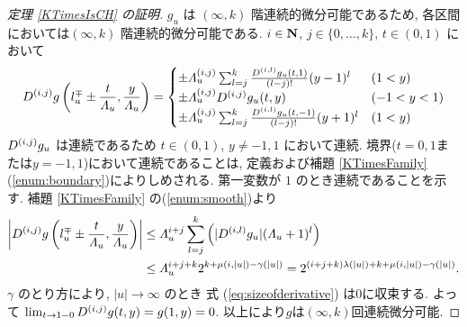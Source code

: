 \begin{proof}[\rm 定理 \ref{KTimesIsCH} の証明]
 $g_u$ は $(\infty, k)$ 階連続的微分可能であるため,
 各区間においては$(\infty, k)$ 階連続的微分可能である.
 $i \in \mathbf N$, $j \in \{0, \dots, k\}$, $t \in (0, 1)$ において
\begin{equation}
   D^{(i, j)}g \left(l^\mp_u \pm \frac{t}{\varLambda_u}, \frac{y}{\varLambda_u}\right)
   = \begin{cases}
      \pm \varLambda_u^{(i, j)} \sum^{k}_{l=j} \frac{D^{(i,l)} g_u(t,1)}{(l-j)!}
      (y - 1)^l &  (1<y)
      \\
      \pm \varLambda_u^{(i,j)} D^{(i, j)} g_u(t, y) & (-1 < y < 1)
      \\
      \pm \varLambda_u^{(i, j)} \sum^{k}_{l=j} 
      \frac{D^{(i,l)} g_u(t, -1)}{(l-j)!} (y + 1)^l &  (1<y)
    \end{cases}
\end{equation}
 $D^{(i,j)}g_u$ は連続であるため 
 $t \in (0,1)$, $y \not = -1, 1$ において連続.
 境界($t = 0, 1$または$y = -1, 1$)において連続であることは,
 定義および補題 \ref{KTimesFamily} (\ref{enum:boundary})によりしめされる.
 第一変数が $1$ のとき連続であることを示す.
 補題 \ref{KTimesFamily} の(\ref{enum:smooth})より
 \begin{align}
  \left|D^{(i, j)}g \left(l^\mp_u \pm \frac{t}{\varLambda_u},
  \frac{y}{\varLambda_u}\right)\right|
  &\le 
  \varLambda_u^{i+j} \sum^{k}_{l=j} \left(|D^{(i,l)} g_u |(\varLambda_u + 1)^l \right)
\notag
  \\
  & \le \varLambda_u^{i+j+k}  2^{k + \mu(i, |u|) - \gamma(|u|)}
   =  2^{(i+j+k)\lambda(|u|) + k + \mu(i, |u|)  - \gamma(|u|)}. 
  \label{eq:sizeofderivative}
 \end{align}
 $\gamma$ のとり方により, $|u| \to \infty$ のとき 
 式 (\ref{eq:sizeofderivative}) は$0$に収束する.
 よって  $\lim_{t \to 1-0}D^{(i,j)} g(t,y) = g(1, y) = 0$.
 以上により$g$は$(\infty, k)$回連続微分可能.
\end{proof}


